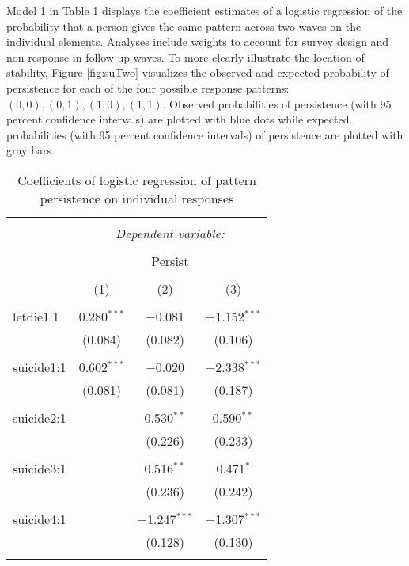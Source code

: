 \documentclass[12pt,]{article}
\begin{document}
Model 1 in Table 1 displays the coefficient estimates of a logistic regression of the probability that a person gives the same pattern across two waves on the individual elements. Analyses include weights to account for survey design and non-response in follow up waves. To more clearly illustrate the location of stability, Figure \ref{fig:suTwo} visualizes the observed and expected probability of persistence for each of the four possible response patterns: \({(0,0), (0,1), (1,0), (1,1)}\). Observed probabilities of persistence (with 95 percent confidence intervals) are plotted with blue dots while expected probabilities (with 95 percent confidence intervals) of persistence are plotted with gray bars.

\begin{table}[!htbp] \centering 
  \caption{Coefficients of logistic regression of pattern persistence on individual responses} 
  \label{} 
\begin{tabular}{@{\extracolsep{5pt}}lccc} 
\\[-1.8ex]\hline 
\hline \\[-1.8ex] 
 & \multicolumn{3}{c}{\textit{Dependent variable:}} \\ 
\cline{2-4} 
\\[-1.8ex] & \multicolumn{3}{c}{Persist} \\ 
\\[-1.8ex] & (1) & (2) & (3)\\ 
\hline \\[-1.8ex] 
 letdie1:1 & 0.280$^{***}$ & $-$0.081 & $-$1.152$^{***}$ \\ 
  & (0.084) & (0.082) & (0.106) \\ 
  & & & \\ 
 suicide1:1 & 0.602$^{***}$ & $-$0.020 & $-$2.338$^{***}$ \\ 
  & (0.081) & (0.081) & (0.187) \\ 
  & & & \\ 
 suicide2:1 &  & 0.530$^{**}$ & 0.590$^{**}$ \\ 
  &  & (0.226) & (0.233) \\ 
  & & & \\ 
 suicide3:1 &  & 0.516$^{**}$ & 0.471$^{*}$ \\ 
  &  & (0.236) & (0.242) \\ 
  & & & \\ 
 suicide4:1 &  & $-$1.247$^{***}$ & $-$1.307$^{***}$ \\ 
  &  & (0.128) & (0.130) \\ 
  & & & \\ 

\end{tabular}
\end{table}
\end{document}
